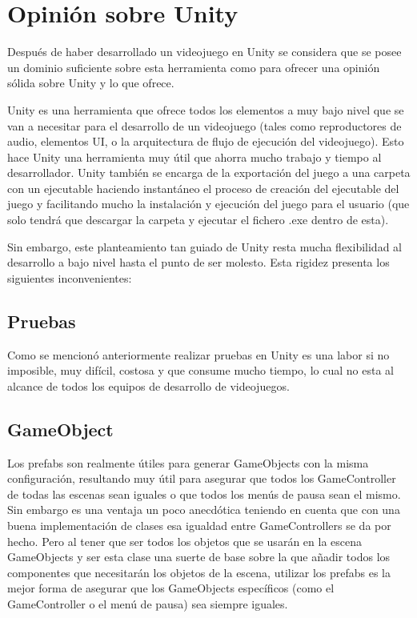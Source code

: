 \section{Opinión sobre Unity}
Después de haber desarrollado un videojuego en Unity se considera que se posee un dominio suficiente sobre esta herramienta como para ofrecer una opinión sólida sobre Unity y lo que ofrece.

Unity es una herramienta que ofrece todos los elementos a muy bajo nivel que se van a necesitar para el desarrollo de un videojuego (tales como reproductores de audio, elementos UI, o la arquitectura de flujo de ejecución del videojuego). Esto hace Unity una herramienta muy útil que ahorra mucho trabajo y tiempo al desarrollador. Unity también se encarga de la exportación del juego a una carpeta con un ejecutable haciendo instantáneo el proceso de creación del ejecutable del juego y facilitando mucho la instalación y ejecución del juego para el usuario (que solo tendrá que descargar la carpeta y ejecutar el fichero .exe dentro de esta).

Sin embargo, este planteamiento tan guiado de Unity resta mucha flexibilidad al desarrollo a bajo nivel hasta el punto de ser molesto. Esta rigidez presenta los siguientes inconvenientes:

\subsection{Pruebas}
Como se mencionó anteriormente realizar pruebas en Unity es una labor si no imposible, muy difícil, costosa y que consume mucho tiempo, lo cual no esta al alcance de todos los equipos de desarrollo de videojuegos.

\subsection{GameObject}
Los prefabs son realmente útiles para generar GameObjects con la misma configuración, resultando muy útil para asegurar que todos los GameController de todas las escenas sean iguales o que todos los menús de pausa sean el mismo. Sin embargo es una ventaja un poco anecdótica teniendo en cuenta que con una buena implementación de clases esa igualdad entre GameControllers se da por hecho. Pero al tener que ser todos los objetos que se usarán en la escena GameObjects y ser esta clase una suerte de base sobre la que añadir todos los componentes que necesitarán los objetos de la escena, utilizar los prefabs es la mejor forma de asegurar que los GameObjects específicos (como el GameController o el menú de pausa) sea siempre iguales.

